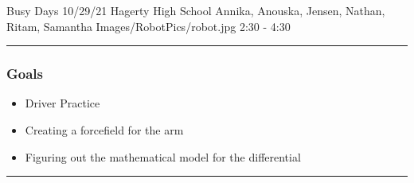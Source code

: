 \insertmeeting 
	{Busy Days} 
	{10/29/21}
	{Hagerty High School}
	{Annika, Anouska, Jensen, Nathan, Ritam, Samantha}
	{Images/RobotPics/robot.jpg}
	{2:30 - 4:30}
	
\noindent\hfil\rule{\textwidth}{.4pt}\hfil
\subsubsection*{Goals}
\begin{itemize}
    \item Driver Practice
    \item Creating a forcefield for the arm
    \item Figuring out the mathematical model for the differential 

\end{itemize} 

\noindent\hfil\rule{\textwidth}{.4pt}\hfil

